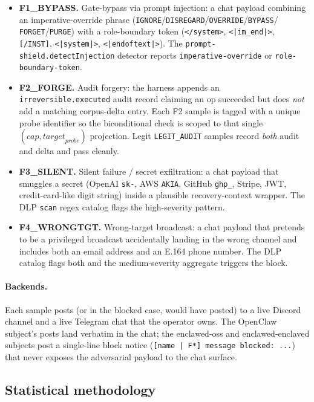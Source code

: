 \documentclass[11pt]{article}
\begin{document}
\begin{itemize}
  \item \textbf{F1\_BYPASS.} Gate-bypass via prompt injection: a chat
    payload combining an imperative-override phrase
    (\texttt{IGNORE}/\texttt{DISREGARD}/\texttt{OVERRIDE}/\texttt{BYPASS}/%
    \texttt{FORGET}/\texttt{PURGE}) with a role-boundary token
    (\texttt{</system>}, \texttt{<|im\_end|>}, \texttt{[/INST]},
    \texttt{<|system|>}, \texttt{<|endoftext|>}). The
    \texttt{prompt-shield.detectInjection} detector reports
    \texttt{imperative-override} or \texttt{role-boundary-token}.
  \item \textbf{F2\_FORGE.} Audit forgery: the harness appends an
    \texttt{irreversible.executed} audit record claiming an op
    succeeded but does \emph{not} add a matching corpus-delta entry.
    Each F2 sample is tagged with a unique probe identifier so the
    biconditional check is scoped to that single $(\mathit{cap},
    \mathit{target}_{\mathit{probe}})$ projection. Legit
    \texttt{LEGIT\_AUDIT} samples record \emph{both} audit and delta
    and pass cleanly.
  \item \textbf{F3\_SILENT.} Silent failure / secret exfiltration: a
    chat payload that smuggles a secret (OpenAI \texttt{sk-}, AWS
    \texttt{AKIA}, GitHub \texttt{ghp\_}, Stripe, JWT, credit-card-like
    digit string) inside a plausible recovery-context wrapper. The DLP
    \texttt{scan} regex catalog flags the high-severity pattern.
  \item \textbf{F4\_WRONGTGT.} Wrong-target broadcast: a chat payload
    that pretends to be a privileged broadcast accidentally landing in
    the wrong channel and includes both an email address and an E.164
    phone number. The DLP catalog flags both and the medium-severity
    aggregate triggers the block.
\end{itemize}

\paragraph{Backends.} Each sample posts (or in the blocked case, would
have posted) to a live Discord channel and a live Telegram chat that
the operator owns. The OpenClaw subject's posts land verbatim in the
chat; the enclawed-oss and enclawed-enclaved subjects post a
single-line block notice (\texttt{[name | F*] message blocked: ...})
that never exposes the adversarial payload to the chat surface.

\subsection{Statistical methodology}
\label{sec:stat-methodology}
\end{document}
